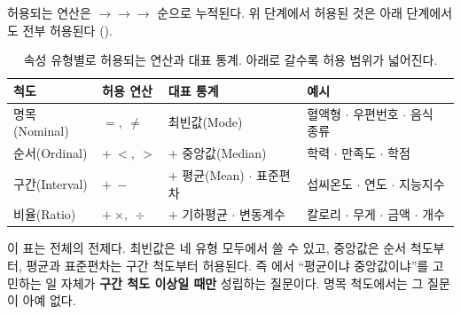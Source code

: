 허용되는 연산은 $\to$$\to$$\to$
순으로 누적된다. 위 단계에서 허용된 것은 아래 단계에서도 전부 허용된다
().

\begin{table}[H]\centering
\caption{속성 유형별로 허용되는 연산과 대표 통계. 아래로 갈수록 허용 범위가
넓어진다.}
\label{tab:attr-ops}
\begin{tabularx}{\linewidth}{@{}l l l X@{}}
\toprule
척도 & 허용 연산 & 대표 통계 & 예시 \\
\midrule
명목(Nominal)  & $=,\ \neq$                    & 최빈값(Mode)
               & 혈액형 $\cdot$ 우편번호 $\cdot$ 음식 종류 \\
\midrule
순서(Ordinal)  & $+\ <,\ >$                    & $+$ 중앙값(Median)
               & 학력 $\cdot$ 만족도 $\cdot$ 학점 \\
\midrule
구간(Interval) & $+\ -$                        & $+$ 평균(Mean) $\cdot$ 표준편차
               & 섭씨온도 $\cdot$ 연도 $\cdot$ 지능지수 \\
\midrule
비율(Ratio)    & $+\ \times,\ \div$            & $+$ 기하평균 $\cdot$ 변동계수
               & 칼로리 $\cdot$ 무게 $\cdot$ 금액 $\cdot$ 개수 \\
\bottomrule
\end{tabularx}
\end{table}

이 표는  전체의 전제다. 최빈값은 네 유형 모두에서 쓸 수
있고, 중앙값은 순서 척도부터, 평균과 표준편차는 구간 척도부터 허용된다. 즉
에서 ``평균이냐 중앙값이냐''를 고민하는 일 자체가 \textbf{구간
척도 이상일 때만} 성립하는 질문이다. 명목 척도에서는 그 질문이 아예 없다.


